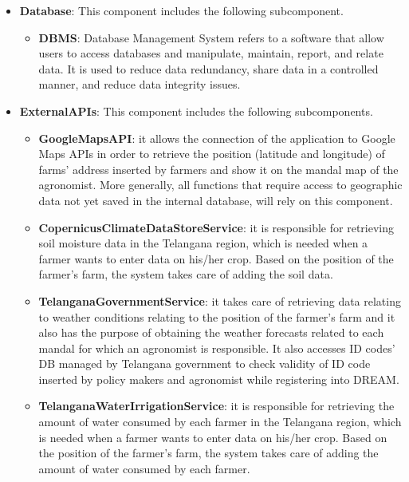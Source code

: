 \begin{itemize}
\item \textbf{Database}: This component includes the following subcomponent.

\begin{itemize}
    \item \textbf{DBMS}: Database Management System refers to a software that allow users to access databases and manipulate, maintain, report, and relate data. It is used to reduce data redundancy, share data in a controlled manner, and reduce data integrity issues.
\end{itemize}

\item \textbf{ExternalAPIs}: This component includes the following subcomponents.

\begin{itemize}
    \item \textbf{GoogleMapsAPI}: it allows the connection of the application to Google Maps APIs in order to retrieve the position (latitude and longitude) of farms’ address inserted by farmers and show it on the mandal map of the agronomist. More generally, all functions that require access to geographic data not yet saved in the internal database, will rely on this component.
    \item \textbf{CopernicusClimateDataStoreService}: it is responsible for retrieving soil moisture data in the Telangana region, which is needed when a farmer wants to enter data on his/her crop. Based on the position of the farmer's farm, the system takes care of adding the soil data.
    \item \textbf{TelanganaGovernmentService}: it takes care of retrieving data relating to weather conditions relating to the position of the farmer's farm and it also has the purpose of obtaining the weather forecasts related to each mandal for which an agronomist is responsible. It also accesses ID codes' DB managed by Telangana government to check validity of ID code inserted by policy makers and agronomist while registering into DREAM. 
    \item \textbf{TelanganaWaterIrrigationService}: it is responsible for retrieving the amount of water consumed by each farmer in the Telangana region, which is needed when a farmer wants to enter data on his/her crop. Based on the position of the farmer's farm, the system takes care of adding the amount of water consumed by each farmer.
\end{itemize}

\end{itemize}

